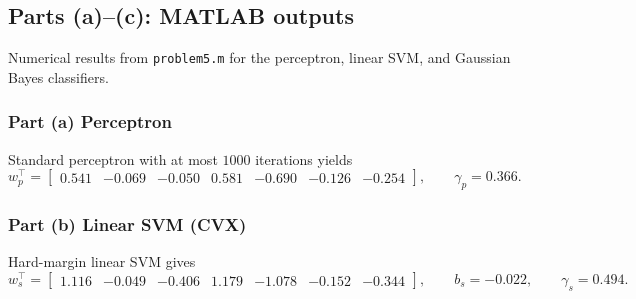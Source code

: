 \documentclass[fleqn]{article}
\begin{document}
    \subsection{Parts (a)--(c): MATLAB outputs}
    Numerical results from \texttt{problem5.m} for the perceptron, linear SVM, and Gaussian Bayes classifiers.
    \subsubsection*{Part (a) Perceptron}
    Standard perceptron with at most $1000$ iterations yields
    \[
        w_p^\top=
        \begin{bmatrix}
            0.541 & -0.069 & -0.050 & 0.581 & -0.690 & -0.126 & -0.254
        \end{bmatrix},
        \qquad
        \gamma_p=0.366.
    \]

    \subsubsection*{Part (b) Linear SVM (CVX)}
    Hard-margin linear SVM gives
    \[
        w_s^\top=
        \begin{bmatrix}
            1.116 & -0.049 & -0.406 & 1.179 & -1.078 & -0.152 & -0.344
        \end{bmatrix},
        \qquad
        b_s=-0.022,
        \qquad
        \gamma_s=0.494.
    \]
\end{document}

